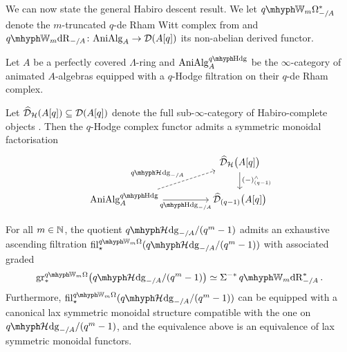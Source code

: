 \documentclass[DIV=12,numbers=enddot,leqno,bibliography=totoc]{scrartcl}
\begin{document}
	We can now state the general Habiro descent result. We let $\qIW_m\Omega_{-/A}^*$ denote the $m$-truncated $q$-de Rham Witt complex from \cite[Definition~]{qWitt} and $\qIW_m\deRham_{-/A}\colon \cat{AniAlg}_A\rightarrow \Dd(A[q])$ its non-abelian derived functor.
	\begin{thm}\label{thm:HabiroDescent}
		Let $A$ be a perfectly covered $\Lambda$-ring and $\cat{AniAlg}_A^{\qHodge}$ be the $\infty$-category of animated $A$-algebras equipped with a $q$-Hodge filtration on their $q$-de Rham complex.
		\begin{alphanumerate}
			\item Let $\widehat{\mathcal{D}}_{\mathcal{H}}(A[q])\subseteq \mathcal{D}(A[q])$ denote the full sub-$\infty$-category of Habiro-complete objects . Then the $q$-Hodge complex functor admits a symmetric monoidal factorisation\label{enum:HabiroDescent}
			\begin{equation*}
				\begin{tikzcd}[column sep=huge]
					& \widehat{\Dd}_\Hh\bigl(A[q]\bigr)\dar["(-)_{(q-1)}^\complete"]\\
					\cat{AniAlg}_A^{\qHodge}\rar["\qHodge_{-/A}"']\urar[dashed,"\qHhodge_{-/A}"] & \widehat{\Dd}_{(q-1)}\bigl(A[q]\bigr)
				\end{tikzcd}
			\end{equation*}
			\item For all $m\in\mathbb{N}$, the quotient $\qHhodge_{-/A}/(q^m-1)$ admits an exhaustive ascending filtration $ \fil_\star ^{\qIW_m\Omega}(\qHhodge_{-/A}/(q^m-1))$ with associated graded\label{enum:qdRWComparison}
			\begin{equation*}
				\gr_*^{\qIW_m\Omega}\bigl(\qHhodge_{-/A}/(q^m-1)\bigr)\simeq \Sigma^{-*}\qIW_m\deRham_{-/A}^*\,.
			\end{equation*}
			Furthermore, $ \fil_\star ^{\qIW_m\Omega}(\qHhodge_{-/A}/(q^m-1))$ can be equipped with a canonical lax symmetric monoidal structure compatible with the one on $\qHhodge_{-/A}/(q^m-1)$, and the equivalence above is an equivalence of lax symmetric monoidal functors.
		\end{alphanumerate}
	\end{thm}
\end{document}
